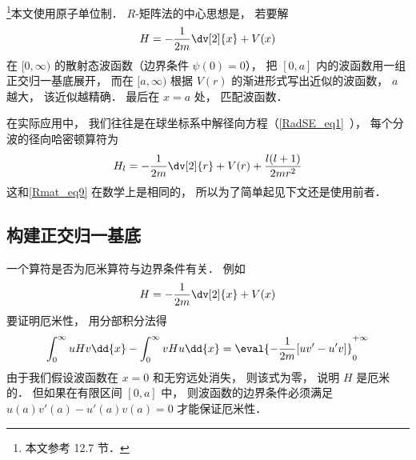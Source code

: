 

\footnote{本文参考 \cite{Brandsen} 12.7 节．}本文使用原子单位制． $R$-矩阵法的中心思想是， 若要解
\begin{equation}\label{Rmat_eq9}
H = -\frac{1}{2m}\dv[2]{x} + V(x)
\end{equation}
在 $[0, \infty)$ 的散射态波函数（边界条件 $\psi(0) = 0$）， 把 $[0,a]$ 内的波函数用一组正交归一基底展开， 而在 $[a,\infty)$ 根据 $V(r)$ 的渐进形式写出近似的波函数， $a$ 越大， 该近似越精确． 最后在 $x=a$ 处， 匹配波函数．

在实际应用中， 我们往往是在球坐标系中解径向方程（\autoref{RadSE_eq1}~）， 每个分波的径向哈密顿算符为
\begin{equation}
H_l = -\frac{1}{2m} \dv[2]{r} + V(r) + \frac{l(l + 1)}{2mr^2}
\end{equation}
这和\autoref{Rmat_eq9} 在数学上是相同的， 所以为了简单起见下文还是使用前者．

\subsection{构建正交归一基底}
一个算符是否为厄米算符与边界条件有关． 例如
\begin{equation}
H = -\frac{1}{2m}\dv[2]{x} + V(x)
\end{equation}
要证明厄米性， 用分部积分法得
\begin{equation}\label{Rmat_eq1}
\int_{0}^{\infty} uHv\dd{x} - \int_{0}^{\infty} vHu\dd{x}
= \eval{-\frac{1}{2m}[uv' - u'v]}_{0}^{+\infty}
\end{equation}
由于我们假设波函数在 $x=0$ 和无穷远处消失， 则该式为零， 说明 $H$ 是厄米的． 但如果在有限区间 $[0, a]$ 中， 则波函数的边界条件必须满足 $u(a)v'(a) - u'(a)v(a) = 0$ 才能保证厄米性．

